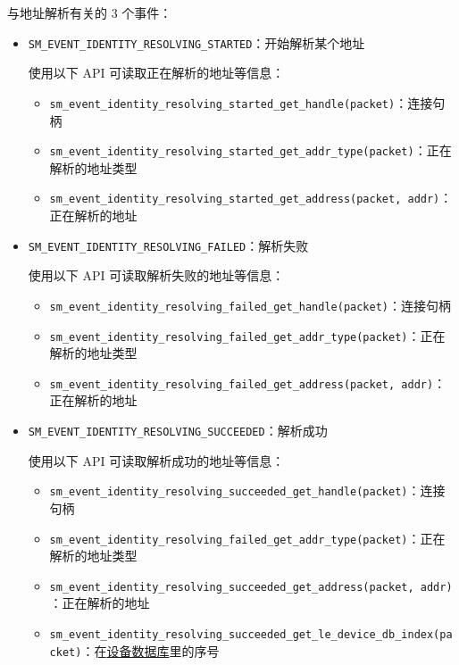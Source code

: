 \documentclass[
  12pt,
]{book}
\providecommand{\tightlist}{%
  \setlength{\itemsep}{0pt}\setlength{\parskip}{0pt}}
\begin{document}
与地址解析有关的 3 个事件：

\begin{itemize}
\item
  \texttt{SM\_EVENT\_IDENTITY\_RESOLVING\_STARTED}：开始解析某个地址

  使用以下 API 可读取正在解析的地址等信息：

  \begin{itemize}
  \tightlist
  \item
    \texttt{sm\_event\_identity\_resolving\_started\_get\_handle(packet)}：连接句柄
  \item
    \texttt{sm\_event\_identity\_resolving\_started\_get\_addr\_type(packet)}：正在解析的地址类型
  \item
    \texttt{sm\_event\_identity\_resolving\_started\_get\_address(packet,\ addr)}：正在解析的地址
  \end{itemize}
\item
  \texttt{SM\_EVENT\_IDENTITY\_RESOLVING\_FAILED}：解析失败

  使用以下 API 可读取解析失败的地址等信息：

  \begin{itemize}
  \tightlist
  \item
    \texttt{sm\_event\_identity\_resolving\_failed\_get\_handle(packet)}：连接句柄
  \item
    \texttt{sm\_event\_identity\_resolving\_failed\_get\_addr\_type(packet)}：正在解析的地址类型
  \item
    \texttt{sm\_event\_identity\_resolving\_failed\_get\_address(packet,\ addr)}：正在解析的地址
  \end{itemize}
\item
  \texttt{SM\_EVENT\_IDENTITY\_RESOLVING\_SUCCEEDED}：解析成功

  使用以下 API 可读取解析成功的地址等信息：

  \begin{itemize}
  \tightlist
  \item
    \texttt{sm\_event\_identity\_resolving\_succeeded\_get\_handle(packet)}：连接句柄
  \item
    \texttt{sm\_event\_identity\_resolving\_failed\_get\_addr\_type(packet)}：正在解析的地址类型
  \item
    \texttt{sm\_event\_identity\_resolving\_succeeded\_get\_address(packet,\ addr)}：正在解析的地址
  \item
    \texttt{sm\_event\_identity\_resolving\_succeeded\_get\_le\_device\_db\_index(packet)}：在\protect\hyperlink{ch98-le-dev-db}{设备数据库}里的序号
  \end{itemize}
\end{itemize}
\end{document}
